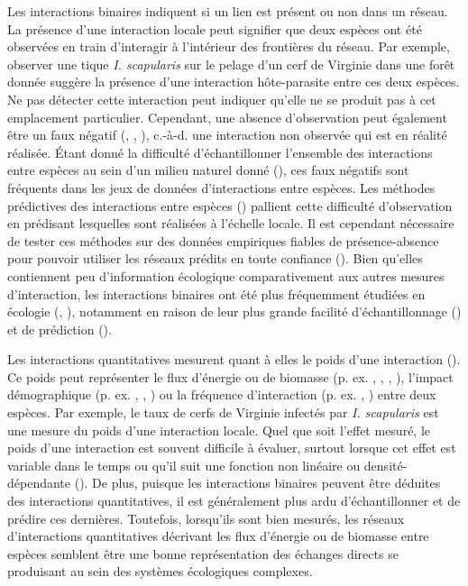 Les interactions binaires indiquent si un lien est présent ou non dans un
réseau. La présence d'une interaction locale peut signifier que deux espèces ont
été observées en train d'interagir à l'intérieur des frontières du réseau. Par
exemple, observer une tique \textit{I. scapularis} sur le pelage d'un cerf de
Virginie dans une forêt donnée suggère la présence d'une interaction
hôte-parasite entre ces deux espèces. Ne pas détecter cette interaction peut
indiquer qu'elle ne se produit pas à cet emplacement particulier. Cependant, une
absence d'observation peut également être un faux négatif
(\cite{Bluthgen2010Why}, \cite{Chacoff2012Evaluating}, \cite{Stock2017Linear}),
c.-à-d. une interaction non observée qui est en réalité réalisée. Étant
donné la difficulté d'échantillonner l'ensemble des interactions entre espèces
au sein d'un milieu naturel donné (\cite{Jordano2016Sampling}), ces faux
négatifs sont fréquents dans les jeux de données d'interactions entre espèces.
Les méthodes prédictives des interactions entre espèces
(\cite{Strydom2021Roadmapa}) pallient cette difficulté d'observation en
prédisant lesquelles sont réalisées à l'échelle locale. Il est cependant
nécessaire de tester ces méthodes sur des données empiriques fiables de
présence-absence pour pouvoir utiliser les réseaux prédits en toute confiance
(\cite{Brimacombe2024Applying}). Bien qu'elles contiennent peu d'information
écologique comparativement aux autres mesures d'interaction, les interactions
binaires ont été plus fréquemment étudiées en écologie
(\cite{Pascual2006Ecological}, \cite{Delmas2019Analysing}), notamment en raison
de leur plus grande facilité d'échantillonnage (\cite{Jordano2016Sampling}) et
de prédiction (\cite{Strydom2021Roadmapa}).

Les interactions quantitatives mesurent quant à elles le poids d'une interaction
(\cite{Berlow2004Interaction}). Ce poids peut représenter le flux d'énergie ou
de biomasse (p. ex. \cite{Benke2001Food}, \cite{Post2002Long},
\cite{Bersier2002Quantitative}, \cite{Borrett2019Walk}), l'impact démographique
(p. ex. \cite{Paine1992Foodweb}, \cite{Kokkoris2002Variability},
\cite{Emmerson2004Predatorprey}) ou la fréquence d'interaction (p. ex.
\cite{Herrera1989Pollinator}, \cite{Montoya2003Food}) entre deux espèces. Par
exemple, le taux de cerfs de Virginie infectés par \textit{I. scapularis} est
une mesure du poids d'une interaction locale. Quel que soit l'effet mesuré, le
poids d'une interaction est souvent difficile à évaluer, surtout lorsque cet
effet est variable dans le temps ou qu'il suit une fonction non linéaire ou
densité-dépendante (\cite{Wootton2005Measurement}). De plus, puisque les
interactions binaires peuvent être déduites des interactions quantitatives, il
est généralement plus ardu d'échantillonner et de prédire ces dernières.
Toutefois, lorsqu'ils sont bien mesurés, les réseaux d'interactions
quantitatives décrivant les flux d'énergie ou de biomasse entre espèces semblent
être une bonne représentation des échanges directs se produisant au sein des
systèmes écologiques complexes. 

